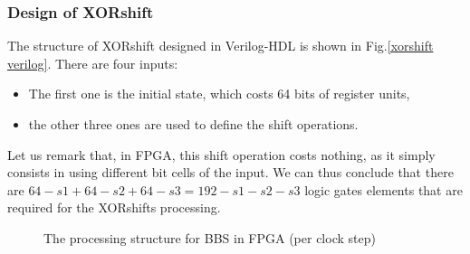 \subsubsection{Design of XORshift}

The structure of XORshift designed in Verilog-HDL is shown in Fig.\ref{xorshift verilog}. There are four inputs:
\begin{itemize}
\item The first one is the initial state, which costs 64 bits 
of register units,
\item the other three ones are used to define the shift operations.
\end{itemize}
Let us remark that, in FPGA, this shift operation costs nothing,
as it simply consists in using different bit cells of the input. 
We can thus conclude that there are $64 - s1 + 64 -s2 + 64 -s3 
= 192 - s1 - s2 - s3$ logic gates elements that are required for
the XORshifts processing. 
\begin{figure}
\begin{center}
\end{center}
\caption{The processing structure for BBS in FPGA (per clock step)}
\end{figure}

